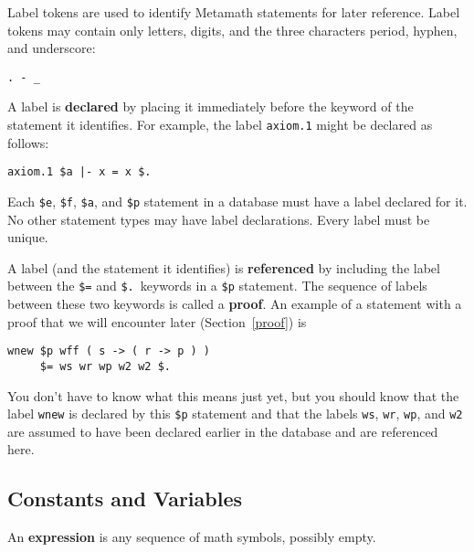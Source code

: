 Label tokens are used to identify Metamath statements for
later reference. Label tokens may contain only letters, digits, and the three
characters period, hyphen, and underscore:
\begin{verbatim}
. - _
\end{verbatim}

A label is {\bf declared} by placing it immediately
before the keyword of the statement it identifies.  For example, the label
\texttt{axiom.1} might be declared as follows:
\begin{verbatim}
axiom.1 $a |- x = x $.
\end{verbatim}

Each \texttt{\$e},
\texttt{\$f},
\texttt{\$a}, and
\texttt{\$p} statement in a database must
have a label declared for it.  No other statement types may have label
declarations.  Every label must be unique.

A label (and the statement it identifies) is {\bf referenced} by including the label between the \texttt{\$=} and \texttt{\$.}\ keywords in a \texttt{\$p}
statement.  The sequence of labels between these two
keywords is called a {\bf proof}.  An example of a statement with
a proof that we will encounter later (Section~\ref{proof}) is
\begin{verbatim}
wnew $p wff ( s -> ( r -> p ) )
     $= ws wr wp w2 w2 $.
\end{verbatim}

You don't have to know what this means just yet, but you should know that the
label \texttt{wnew} is declared by this \texttt{\$p} statement and that the labels
\texttt{ws}, \texttt{wr}, \texttt{wp}, and \texttt{w2} are assumed to have been declared
earlier in the database and are referenced here.

\subsection{Constants and Variables}

An {\bf expression} is any sequence of math
symbols, possibly empty.

